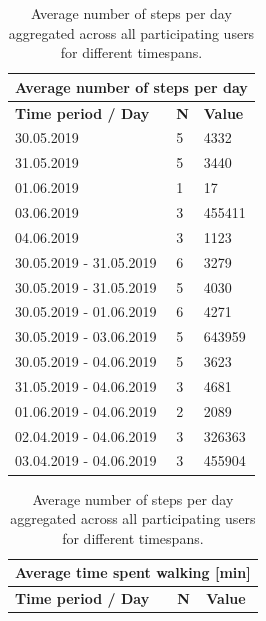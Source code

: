 \begin{table}[]
	\parbox{.45\linewidth}{
		\centering
		\begin{tabular}{|l|l|l|}
			\hline
			\multicolumn{3}{|c|}{\textbf{Average number of steps per day}}          \\ \hline
			\textbf{Time period / Day} & \textbf{N} & \textbf{Value}           \\ \hline
			30.05.2019                 & 5          & 4332                     \\ \hline
			31.05.2019                 & 5          & 3440                     \\ \hline
			01.06.2019                 & 1          & 17                       \\ \hline
			03.06.2019                 & 3          & 455411                   \\ \hline
			04.06.2019                 & 3          & 1123                     \\ \hline
			30.05.2019 - 31.05.2019    & 6          & 3279                     \\ \hline
			30.05.2019 - 31.05.2019    & 5          & 4030                     \\ \hline
			30.05.2019 - 01.06.2019    & 6          & 4271                     \\ \hline
			30.05.2019 - 03.06.2019    & 5          & 643959                   \\ \hline
			30.05.2019 - 04.06.2019    & 5          & 3623                     \\ \hline
			31.05.2019 - 04.06.2019    & 3          & 4681                     \\ \hline
			01.06.2019 - 04.06.2019    & 2          & 2089                     \\ \hline
			02.04.2019 - 04.06.2019    & 3          & 326363                   \\ \hline
			03.04.2019 - 04.06.2019    & 3          & 455904                   \\ \hline
		\end{tabular}
		\caption{Average number of steps per day aggregated across all participating users for different timespans.}
		\label{results-steps}
	}
	\hfill
	\parbox{.45\linewidth}{
		\centering
		\begin{tabular}{|l|l|l|}
			\hline
			\multicolumn{3}{|c|}{\textbf{Average time spent walking {[}min{]}}}          \\ \hline
			\textbf{Time period / Day} & \textbf{N} & \textbf{Value} \\ \hline

\end{tabular}}
\end{table}
